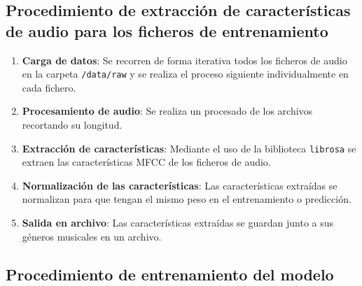 
\subsection{Procedimiento de extracción de características de audio para los ficheros de entrenamiento}

\begin{enumerate}
\tightlist

\item \textbf{Carga de datos}: Se recorren de forma iterativa todos los ficheros de audio en la carpeta \texttt{/data/raw} y se realiza el proceso siguiente individualmente en cada fichero.

\item \textbf{Procesamiento de audio}: Se realiza un procesado de los archivos recortando su longitud.

\item \textbf{Extracción de características}: Mediante el uso de la biblioteca \texttt{librosa} se extraen las características MFCC de los ficheros de audio.

\item \textbf{Normalización de las características}: Las características extraídas se normalizan para que tengan el mismo peso en el entrenamiento o predicción.

\item \textbf{Salida en archivo}: Las características extraídas se guardan junto a sus géneros musicales en un archivo.

\end{enumerate}


\subsection{Procedimiento de entrenamiento del modelo}

